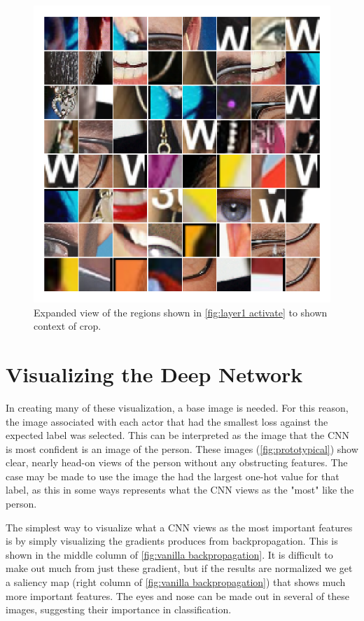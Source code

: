 \documentclass{article}
\begin{document}
\begin{figure}
	\includegraphics[width=\linewidth]{layer1_activate_border}
	\caption{Expanded view of the regions shown in \cref{fig:layer1 activate} to shown context of crop.}
	\label{fig:layer1 activate border}
\end{figure}

\clearpage

\FloatBarrier
\section[Visualization]{Visualizing the Deep Network}\label{sec:main}

In creating many of these visualization, a base image is needed. For this reason, the image associated with each actor that had the smallest loss against the expected label was selected. This can be interpreted as the image that the CNN is most confident is an image of the person. These images (\cref{fig:prototypical}) show clear, nearly head-on views of the person without any obstructing features. The case may be made to use the image the had the largest one-hot value for that label, as this in some ways represents what the CNN views as the "most" like the person.

The simplest way to visualize what a CNN views as the most important features is by simply visualizing the gradients produces from backpropagation. This is shown in the middle column of \cref{fig:vanilla backpropagation}. It is difficult to make out much from just these gradient, but if the results are normalized we get a saliency map (right column of \cref{fig:vanilla backpropagation}) that shows much more important features. The eyes and nose can be made out in several of these images, suggesting their importance in classification.
\end{document}
